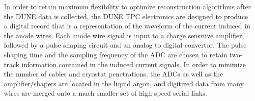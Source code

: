 In order to retain maximum flexibility to optimize reconstruction algorithms after the DUNE data is collected, the DUNE TPC electronics are designed to produce a digital record that is a representation of the waveform of the current induced in the anode wires.  Each anode wire signal is input to a charge sensitive amplifier, followed by a pulse shaping circuit and an analog to digital convertor.  The pulse shaping time and the sampling frequency of the ADC are chosen to retain two-track information contained in the induced current signals.  In order to minimize the number of cables and cryostat penetrations, the ADCs as well as the amplifier/shapers are located in the liquid argon, and digitized data from many wires are merged onto a much smaller set of high speed serial links.  %

